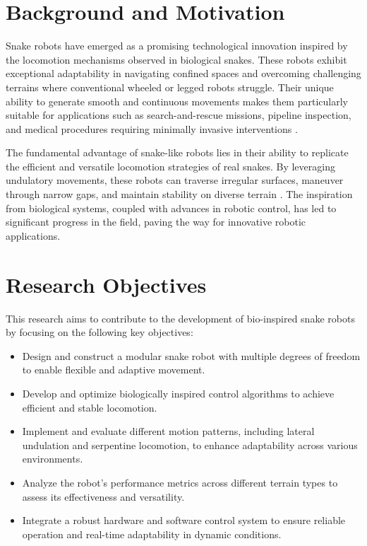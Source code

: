 \documentclass[12pt,a4paper]{report}
\begin{document}
\section{Background and Motivation}
Snake robots have emerged as a promising technological innovation inspired by the locomotion mechanisms observed in biological snakes. These robots exhibit exceptional adaptability in navigating confined spaces and overcoming challenging terrains where conventional wheeled or legged robots struggle. Their unique ability to generate smooth and continuous movements makes them particularly suitable for applications such as search-and-rescue missions, pipeline inspection, and medical procedures requiring minimally invasive interventions \cite{transeth-2009, Hirose2004}.

The fundamental advantage of snake-like robots lies in their ability to replicate the efficient and versatile locomotion strategies of real snakes. By leveraging undulatory movements, these robots can traverse irregular surfaces, maneuver through narrow gaps, and maintain stability on diverse terrain \textcite{Seeja2022}. The inspiration from biological systems, coupled with advances in robotic control, has led to significant progress in the field, paving the way for innovative robotic applications.

\section{Research Objectives}
This research aims to contribute to the development of bio-inspired snake robots by focusing on the following key objectives:

\begin{itemize}
    \item Design and construct a modular snake robot with multiple degrees of freedom to enable flexible and adaptive movement.
    \item Develop and optimize biologically inspired control algorithms to achieve efficient and stable locomotion.
    \item Implement and evaluate different motion patterns, including lateral undulation and serpentine locomotion, to enhance adaptability across various environments.
    \item Analyze the robot's performance metrics across different terrain types to assess its effectiveness and versatility.
    \item Integrate a robust hardware and software control system to ensure reliable operation and real-time adaptability in dynamic conditions.
\end{itemize}
\end{document}
